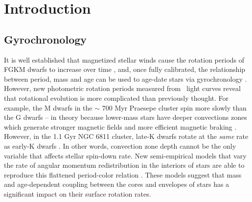 \section{Introduction}

\subsection{Gyrochronology}

It is well established that magnetized stellar winds cause the rotation
periods of FGKM dwarfs to increase over time \citep[\eg][]{schatzman1962,
weber1967, skumanich1972, kawaler1988, pinsonneault1989}, and, once fully
calibrated, the relationship between period, mass and age can be used to
age-date stars via gyrochronology \citep{barnes2003, barnes2007, barnes2010,
meibom2011, meibom2015}.
However, new photometric rotation periods measured from \kepler\ light curves
reveal that rotational evolution is more complicated than previously thought.
For example, the M dwarfs in the $\sim$ 700 Myr Praesepe cluster spin more
slowly than the G dwarfs -- in theory because lower-mass stars have deeper
convections zones which generate stronger magnetic fields and more efficient
magnetic braking \citep{schatzman1962, weber1967}.
However, in the 1.1 Gyr NGC 6811 cluster, late-K dwarfs rotate at the {\it
same} rate as early-K dwarfs \citep{curtis2019}.
In other words, convection zone depth cannot be the only variable that affects
stellar spin-down rate.
New semi-empirical models that vary the rate of angular momentum
redistribution in the interiors of stars are able to reproduce this flattened
period-color relation \citep{spada2019}.
These models suggest that mass and age-dependent coupling between the cores
and envelopes of stars has a significant impact on their surface rotation
rates.

